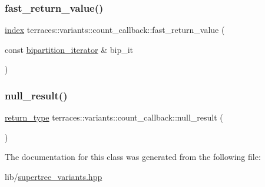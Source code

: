 \mbox{\label{classterraces_1_1variants_1_1count__callback_a5bf31dc18b0ba1ee01d2ae54587db183}} 
\subsubsection{\texorpdfstring{fast\+\_\+return\+\_\+value()}{fast\_return\_value()}}
{\footnotesize\ttfamily \hyperlink{namespaceterraces_adbc33ccb543d1634e96d0eb02e472c77}{index} terraces\+::variants\+::count\+\_\+callback\+::fast\+\_\+return\+\_\+value (\begin{DoxyParamCaption}\item[{const \hyperlink{classterraces_1_1bipartition__iterator}{bipartition\+\_\+iterator} \&}]{bip\+\_\+it }\end{DoxyParamCaption})\hspace{0.3cm}{\ttfamily [inline]}}

\mbox{\label{classterraces_1_1variants_1_1count__callback_ae0d0708bdde2b61cf4e3df15edda9be7}} 
\subsubsection{\texorpdfstring{null\+\_\+result()}{null\_result()}}
{\footnotesize\ttfamily \hyperlink{classterraces_1_1variants_1_1count__callback_adb8cc586b7f8d5aeaa4d1d83c36c5cb8}{return\+\_\+type} terraces\+::variants\+::count\+\_\+callback\+::null\+\_\+result (\begin{DoxyParamCaption}{ }\end{DoxyParamCaption})\hspace{0.3cm}{\ttfamily [inline]}}



The documentation for this class was generated from the following file\+:\begin{DoxyCompactItemize}
\item 
lib/\hyperlink{supertree__variants_8hpp}{supertree\+\_\+variants.\+hpp}\end{DoxyCompactItemize}
